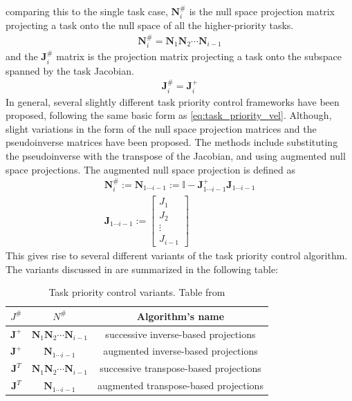comparing this to the single task case, $\bm{N}_i^{\#}$ is the null space projection matrix
projecting a task onto the null space of all the higher-priority tasks.
\begin{align}
    \bm{N}_i^{\#} = \bm{N}_1 \bm{N}_2 \cdots \bm{N}_{i-1}
\end{align}
and the $\bm{J}_i^{\#}$ matrix is the projection matrix projecting a task onto the
subspace spanned by the task Jacobian.
\begin{align}
    \bm{J}_i^{\#} = \bm{J}_i^+
\end{align}
In general, several slightly different task priority control frameworks have
been proposed, following the same basic form as \autoref{eq:task_priority_vel}.
Although, slight variations in the form of the null space projection matrices
and the pseudoinverse matrices have been proposed. The methods include substituting
the pseudoinverse with the transpose of the Jacobian, and using augmented null space
projections.
The augmented null space projection is defined as
\begin{subequations}
    \label{eq:augmented_null_space}
\begin{align}
    \bm{N}_i^{\#} := \bm{N}_{1\cdots i-1} := \mathbb{I} - \bm{J}_{1\cdots i-1}^+ \bm{J}_{1\cdots i-1} \\
    \bm{J}_{1\cdots i-1} := \begin{bmatrix}
        J_1 \\
        J_2 \\
        \vdots \\
        J_{i-1}
    \end{bmatrix}
\end{align}
\end{subequations}
This gives rise to several different variants of the task priority control algorithm.
The variants discussed in \cite{antonelli2009} are summarized in the following table:
\begin{table}[h]
    \centering
    \begin{tabular}{|c|c|c|}
        \hline
        $J^{\#}$ & $N^{\#}$ & Algorithm's name \\
        \hline
        $\bm{J}^+$ & $\bm{N}_1 \bm{N}_2 \cdots \bm{N}_{i-1}$ & successive inverse-based projections \\
        $\bm{J}^+$ & $\bm{N}_{1\cdots i-1}$ & augmented inverse-based projections \\
        $\bm{J}^T$ & $\bm{N}_1 \bm{N}_2 \cdots \bm{N}_{i-1}$ & successive transpose-based projections \\
        $\bm{J}^T$ & $\bm{N}_{1\cdots i-1}$ & augmented transpose-based projections \\
        \hline
    \end{tabular}
    \label{tab:tpc_variants}
    \caption{Task priority control variants. Table from \cite{antonelli2009}}
\end{table}

